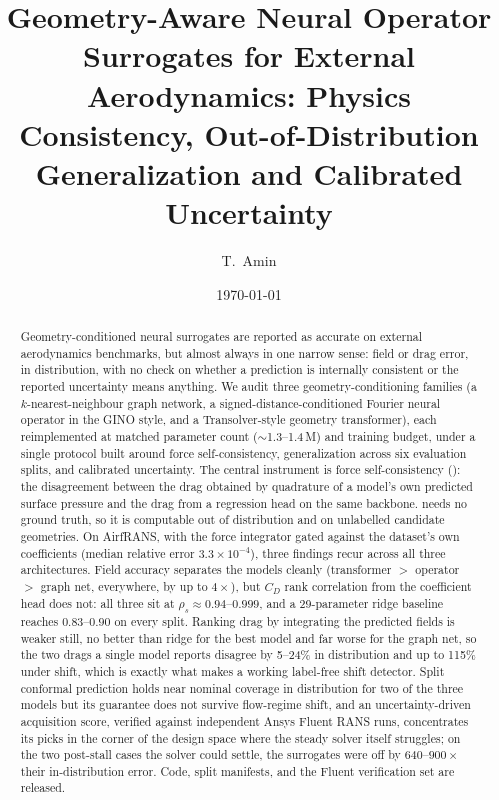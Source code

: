 
\title{Geometry-Aware Neural Operator Surrogates for External Aerodynamics:
       Physics Consistency, Out-of-Distribution Generalization
       and Calibrated Uncertainty}

\author{T.~Amin}
\noaffiliation

\date{\today}

\begin{abstract}
Geometry-conditioned neural surrogates are reported as accurate on external
aerodynamics benchmarks, but almost always in one narrow sense: field or drag
error, in distribution, with no check on whether a prediction is internally
consistent or the reported uncertainty means anything. We audit three
geometry-conditioning families (a $k$-nearest-neighbour graph network, a
signed-distance-conditioned Fourier neural operator in the GINO style, and a
Transolver-style geometry transformer), each reimplemented at matched parameter
count ($\sim$1.3--1.4\,M) and training budget, under a single protocol built
around force self-consistency, generalization across six evaluation splits,
and calibrated uncertainty. The central instrument is force self-consistency
(\FSC): the disagreement between the drag obtained by quadrature of a model's
own predicted surface pressure and the drag from a regression head on the same
backbone. \FSC{} needs no ground truth, so it is computable out of distribution
and on unlabelled candidate geometries. On AirfRANS, with the force integrator
gated against the dataset's own coefficients (median relative error
$3.3\times10^{-4}$), three findings recur across all three architectures. Field
accuracy separates the models cleanly (transformer $>$ operator $>$ graph net,
everywhere, by up to $4\times$), but $C_D$ rank correlation from the coefficient
head does not: all three sit at $\rho_s\approx0.94$--$0.999$, and a 29-parameter
ridge baseline reaches $0.83$--$0.90$ on every split. Ranking drag by
integrating the predicted fields is weaker still, no better than ridge for the
best model and far worse for the graph net, so the two drags a single model
reports disagree by 5--24\% in distribution and up to 115\% under shift, which
is exactly what makes \FSC{} a working label-free shift detector. Split
conformal prediction holds near nominal coverage in distribution for two of the
three models but its guarantee does not survive flow-regime shift, and an
uncertainty-driven acquisition score, verified against independent Ansys Fluent
RANS runs, concentrates its picks in the corner of the design space where the
steady solver itself struggles; on the two post-stall cases the solver could
settle, the surrogates were off by $640$--$900\times$ their in-distribution
error. Code, split manifests, and the Fluent verification set are released.
\end{abstract}

